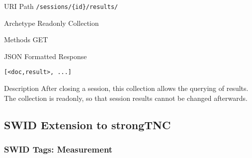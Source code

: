 \documentclass[10pt,a4paper]{scrartcl}
\begin{document}
\begin{mdframed}[style=def]
\begin{description*}
	\item[URI Path] \texttt{/sessions/\{id\}/results/}
	\item[Archetype] Readonly Collection
	\item[Methods] GET
	\item[JSON Formatted Response] \hfill
\begin{lstlisting}
[<doc,result>, ...]
\end{lstlisting}
	\item[Description] After closing a session, this collection allows the
		querying of results. The collection is readonly, so that session results
		cannot be changed afterwards.
\end{description*}
\end{mdframed}


\pagebreak


\subsection{SWID Extension to strongTNC}

\subsubsection{SWID Tags: Measurement}
\end{document}
